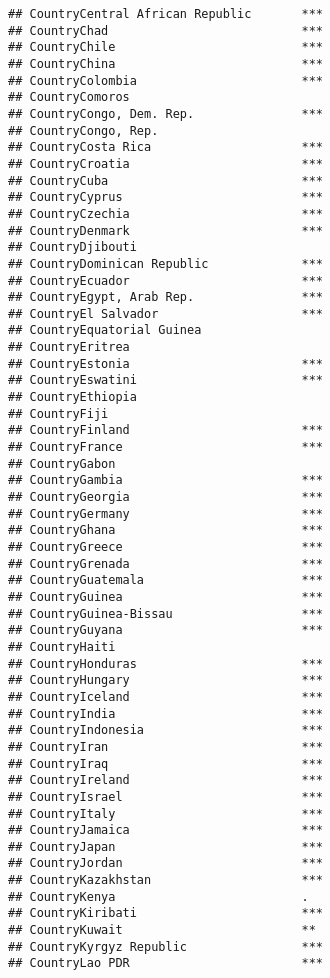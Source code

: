 \documentclass[
]{article}
\begin{document}
\begin{verbatim}
## CountryCentral African Republic       ***
## CountryChad                           ***
## CountryChile                          ***
## CountryChina                          ***
## CountryColombia                       ***
## CountryComoros                           
## CountryCongo, Dem. Rep.               ***
## CountryCongo, Rep.                       
## CountryCosta Rica                     ***
## CountryCroatia                        ***
## CountryCuba                           ***
## CountryCyprus                         ***
## CountryCzechia                        ***
## CountryDenmark                        ***
## CountryDjibouti                          
## CountryDominican Republic             ***
## CountryEcuador                        ***
## CountryEgypt, Arab Rep.               ***
## CountryEl Salvador                    ***
## CountryEquatorial Guinea                 
## CountryEritrea                           
## CountryEstonia                        ***
## CountryEswatini                       ***
## CountryEthiopia                          
## CountryFiji                              
## CountryFinland                        ***
## CountryFrance                         ***
## CountryGabon                             
## CountryGambia                         ***
## CountryGeorgia                        ***
## CountryGermany                        ***
## CountryGhana                          ***
## CountryGreece                         ***
## CountryGrenada                        ***
## CountryGuatemala                      ***
## CountryGuinea                         ***
## CountryGuinea-Bissau                  ***
## CountryGuyana                         ***
## CountryHaiti                             
## CountryHonduras                       ***
## CountryHungary                        ***
## CountryIceland                        ***
## CountryIndia                          ***
## CountryIndonesia                      ***
## CountryIran                           ***
## CountryIraq                           ***
## CountryIreland                        ***
## CountryIsrael                         ***
## CountryItaly                          ***
## CountryJamaica                        ***
## CountryJapan                          ***
## CountryJordan                         ***
## CountryKazakhstan                     ***
## CountryKenya                          .  
## CountryKiribati                       ***
## CountryKuwait                         ** 
## CountryKyrgyz Republic                ***
## CountryLao PDR                        ***

\end{verbatim}
\end{document}
